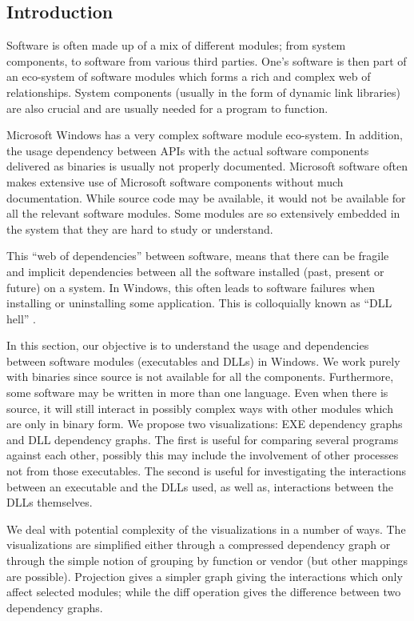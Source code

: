 \subsection{Introduction}



Software is often made up of
a mix of different modules; from system components, to
software from various third parties.
One's software is then part of an eco-system of software modules
which forms a rich and complex web of relationships.
System components (usually in the form of dynamic link libraries)
are also crucial and are usually needed for
a program to function.


Microsoft Windows has a very complex software module eco-system.
In addition, the usage dependency between
APIs with the actual software components delivered as binaries
is usually not properly documented.
Microsoft software often makes extensive
use of Microsoft software components without much documentation.
While source code may be available, it would not be available for all
the relevant software modules.
Some modules are so extensively embedded in the system that they are
hard to study or understand.

This ``web of dependencies'' between software,
means that
there can be fragile and implicit dependencies between all the software
installed (past, present or future) on a system.
In Windows, this often leads to software failures when installing or
uninstalling some application.
This is colloquially known as ``DLL hell'' \cite{anderson2000end}.

In this section, our objective is to understand the usage and dependencies
between software modules (executables and DLLs) in Windows.
We work purely with binaries since source is not available for all the
components. Furthermore, some software may be written in more than
one language.
Even when there is source, it will still interact in possibly complex
ways with other modules which are only in binary form.
We propose two visualizations: EXE dependency graphs and DLL dependency
graphs. The first is useful for comparing several programs
against each other, possibly this may include the involvement
of other processes not from those executables.
The second is useful for investigating the interactions between
an executable and the DLLs used, as well as, interactions
between the DLLs themselves.

We deal with potential complexity of the visualizations in a number of ways.
The visualizations are
simplified either through a compressed dependency graph
or through the simple notion of grouping by function
or vendor (but other mappings are possible).
Projection gives a simpler graph giving the interactions which
only affect selected modules; while the diff operation
gives the difference between two dependency graphs.

